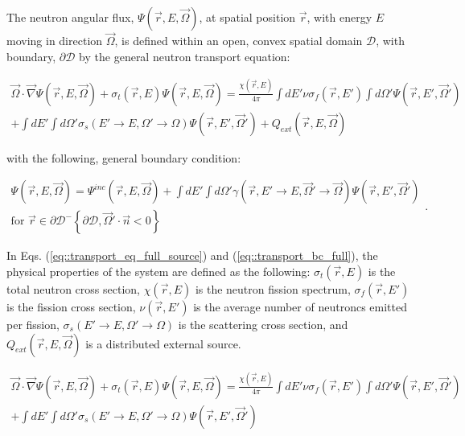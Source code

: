 The neutron angular flux, $\Psi (\vec{r}, E, \vec{\Omega})$, at spatial position $\vec{r}$, with energy $E$ moving in direction $\vec{\Omega}$, is defined within an open, convex spatial domain $\mathcal{D}$, with boundary, $\partial \mathcal{D}$ by the general neutron transport equation:


\begin{equation}
\label{eq::transport_eq_full_source}
\begin{aligned}
	\vec{\Omega} \cdot \vec{\nabla} \Psi (\vec{r}, E, \vec{\Omega})+ \sigma_t (\vec{r}, E) \Psi (\vec{r}, E, \vec{\Omega}) = \frac{\chi (\vec{r}, E)}{4 \pi} \int dE' \nu \sigma_f (\vec{r}, E') \int d\Omega' \Psi (\vec{r}, E', \vec{\Omega}') \\ 
	+ \int dE' \int d\Omega' \sigma_s (E' \rightarrow E, \Omega' \rightarrow \Omega) \Psi (\vec{r}, E', \vec{\Omega}') + Q_{ext} (\vec{r}, E, \vec{\Omega})
\end{aligned}
\end{equation}

\noindent with the following, general boundary condition:

\begin{equation}
\label{eq::transport_bc_full}
\begin{aligned}
	\Psi (\vec{r}, E, \vec{\Omega}) = \Psi^{inc} (\vec{r}, E, \vec{\Omega}) + \int dE' \int d\Omega' \gamma (\vec{r}, E' \rightarrow E, \vec{\Omega}' \rightarrow \vec{\Omega}) \Psi (\vec{r}, E', \vec{\Omega}') \\
	\text{for } \vec{r} \in \partial \mathcal{D}^{-} \left\{   \partial \mathcal{D}, \vec{\Omega}' \cdot \vec{n} < 0  \right\}
\end{aligned} .
\end{equation}

\noindent In Eqs. (\ref{eq::transport_eq_full_source}) and (\ref{eq::transport_bc_full}), the physical properties of the system are defined as the following: $\sigma_t (\vec{r}, E)$ is the total neutron cross section, $\chi (\vec{r}, E)$ is the neutron fission spectrum, $\sigma_f (\vec{r}, E')$ is the fission cross section, $\nu (\vec{r}, E')$ is the average number of neutroncs emitted per fission, $\sigma_s (E' \rightarrow E, \Omega' \rightarrow \Omega)$ is the scattering cross section, and $Q_{ext} (\vec{r}, E, \vec{\Omega})$ is a distributed external source.


\begin{equation}
\label{eq::transport_eq_full_keff}
\begin{aligned}
	\vec{\Omega} \cdot \vec{\nabla} \Psi (\vec{r}, E, \vec{\Omega})+ \sigma_t (\vec{r}, E) \Psi (\vec{r}, E, \vec{\Omega}) = \frac{\chi (\vec{r}, E)}{4 \pi} \int dE' \nu \sigma_f (\vec{r}, E') \int d\Omega' \Psi (\vec{r}, E', \vec{\Omega}') \\ 
	+ \int dE' \int d\Omega' \sigma_s (E' \rightarrow E, \Omega' \rightarrow \Omega) \Psi (\vec{r}, E', \vec{\Omega}') 
\end{aligned}
\end{equation}

